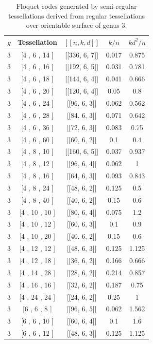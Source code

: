 \documentclass[%
reprint,
amsmath,amssymb,
aps,
]{revtex4-2}
\begin{document}
\begin{table}[b]
	\caption{	\label{tab5}
		Floquet codes generated by semi-regular tessellations derived from regular tessellations over orientable surface of genus $3$.}
	\begin{ruledtabular}
		\begin{tabular}{|c|c|c|c|c|}
			$g$ & Tessellation & $[[n,k,d]]$ & $k/n$ & $kd^{2}/n$ \\
			\hline
	3 & [4 , 6 , 14 ] & [[336, 6, 7]] & 0.017 & 0.875   \\
	3 & [4 , 6 , 16 ] & [[192, 6, 5]] & 0.031 & 0.781 \\
	3 & [4 , 6 , 18 ] & [[144, 6, 4]] & 0.041 & 0.666  \\
	3 & [4 , 6 , 20 ] & [[120, 6, 4]] & 0.05 & 0.8 \\
	3 & [4 , 6 , 24 ] & [[96, 6, 3]] & 0.062 & 0.562 \\
	3 & [4 , 6 , 28 ] & [[84, 6, 3]] & 0.071 & 0.642  \\
	3 & [4 , 6 , 36 ] & [[72, 6, 3]] & 0.083 & 0.75  \\
	3 & [4 , 6 , 60 ] & [[60, 6, 2]] & 0.1 & 0.4 \\
	3 & [4 , 8 , 10 ] & [[160, 6, 5]] & 0.037 & 0.937  \\
	3 & [4 , 8 , 12 ] & [[96, 6, 4]] & 0.062 & 1  \\
	3 & [4 , 8 , 16 ] & [[64, 6, 3]] & 0.093 & 0.843  \\
	3 & [4 , 8 , 24 ] & [[48, 6, 2]] & 0.125 & 0.5  \\
	3 & [4 , 8 , 40 ] & [[40, 6, 2]] & 0.15 & 0.6 \\
	3 & [4 , 10 , 10 ] & [[80, 6, 4]] & 0.075 & 1.2  \\
	3 & [4 , 10 , 12 ] & [[60, 6, 3]] & 0.1 & 0.9  \\
	3 & [4 , 10 , 20 ] & [[40, 6, 2]] & 0.15 & 0.6  \\
	3 & [4 , 12 , 12 ] & [[48, 6, 3]] & 0.125 & 1.125  \\
	3 & [4 , 12 , 18 ] & [[36, 6, 2]] & 0.166 & 0.666  \\
	3 & [4 , 14 , 28 ] & [[28, 6, 2]] & 0.214 & 0.857 \\
	3 & [4 , 16 , 16 ] & [[32, 6, 2]] & 0.187 & 0.75  \\
	3 & [4 , 24 , 24 ] & [[24, 6, 2]] & 0.25 & 1  \\
	3 & [6 , 6 , 8 ] & [[96, 6, 5]] & 0.062 & 1.562  \\
	3 & [6 , 6 , 10 ] & [[60, 6, 4]] & 0.1 & 1.6  \\
	3 & [6 , 6 , 12 ] & [[48, 6, 3]] & 0.125 & 1.125  \\

\end{tabular}
\end{ruledtabular}
\end{table}
\end{document}
